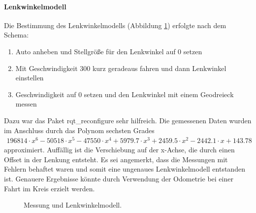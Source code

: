 \paragraph{Lenkwinkelmodell}
Die Bestimmung des Lenkwinkelmodells (Abbildung \ref{fig:Lenkwinkelmodell}) erfolgte nach dem Schema:
\begin{enumerate}
	\item Auto anheben und Stellgr\"o\ss{}e f\"ur den Lenkwinkel auf 0 setzen
	\item Mit Geschwindigkeit 300 kurz geradeaus fahren und dann Lenkwinkel einstellen
	\item Geschwindigkeit auf 0 setzen und den Lenkwinkel mit einem Geodreieck messen
\end{enumerate}
Dazu war das Paket rqt\_reconfigure sehr hilfreich. Die gemessenen Daten wurden im Anschluss durch das Polynom sechsten Grades
\begin{align*}
196814\cdot x^6 - 50518\cdot x^5 - 47550\cdot x^4 + 5979.7\cdot x^3 + 2459.5\cdot x^2 - 2442.1\cdot x + 143.78
\end{align*} 
approximiert.
Auff\"allig ist die Verschiebung auf der x-Achse, die durch einen Offset in der Lenkung entsteht. Es sei angemerkt, dass die Messungen mit Fehlern behaftet waren und somit eine ungenaues Lenkwinkelmodell entstanden ist. Genauere Ergebnisse k\"onnte durch Verwendung der Odometrie bei einer Fahrt im Kreis erzielt werden.
\begin{figure}[h]
	\centering
	\caption{Messung und Lenkwinkelmodell.}
	\label{fig:Lenkwinkelmodell}
\end{figure}